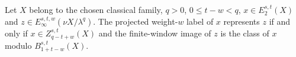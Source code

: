 \begin{proposition}
Let $X$ belong to the chosen classical family, $q>0$, $0\le t-w<q$, $x\in E_2^{s,t}(X)$ and $z\in E_\infty^{s,t,w}(\nu X/\lambda^q)$. The projected weight-$w$ label of $x$ represents $z$ if and only if $x\in Z_{q-t+w}^{s,t}(X)$ and the finite-window image of $z$ is the class of $x$ modulo $B_{1+t-w}^{s,t}(X)$.
\end{proposition}
